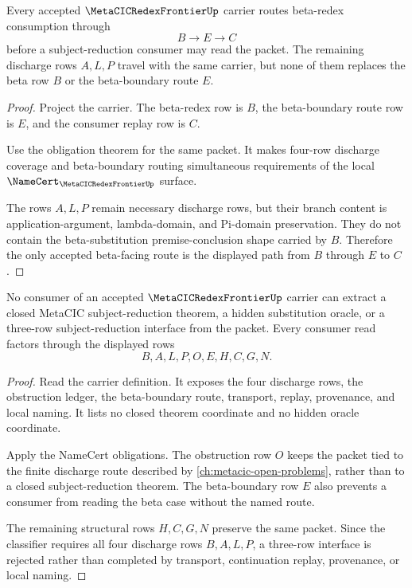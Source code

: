\begin{theorem}
\label{thm:metacic-redex-frontier-beta-boundary}
Every accepted $\MetaCICRedexFrontierUp$ carrier routes beta-redex consumption
through
$$
B \to E \to C
$$
before a subject-reduction consumer may read the packet. The remaining
discharge rows $A,L,P$ travel with the same carrier, but none of them replaces
the beta row $B$ or the beta-boundary route $E$.
\end{theorem}
\begin{proof}
Project the carrier. The beta-redex row is $B$, the beta-boundary route row is
$E$, and the consumer replay row is $C$.

Use the obligation theorem for the same packet. It makes four-row discharge
coverage and beta-boundary routing simultaneous requirements of the local
$\NameCert_{\MetaCICRedexFrontierUp}$ surface.

The rows $A,L,P$ remain necessary discharge rows, but their branch content is
application-argument, lambda-domain, and Pi-domain preservation. They do not
contain the beta-substitution premise-conclusion shape carried by $B$.
Therefore the only accepted beta-facing route is the displayed path from $B$
through $E$ to $C$.
\end{proof}

\begin{theorem}
\label{thm:metacic-redex-frontier-nonescape}
No consumer of an accepted $\MetaCICRedexFrontierUp$ carrier can extract a
closed MetaCIC subject-reduction theorem, a hidden substitution oracle, or a
three-row subject-reduction interface from the packet. Every consumer read
factors through the displayed rows
$$
B,A,L,P,O,E,H,C,G,N.
$$
\end{theorem}
\begin{proof}
Read the carrier definition. It exposes the four discharge rows, the
obstruction ledger, the beta-boundary route, transport, replay, provenance, and
local naming. It lists no closed theorem coordinate and no hidden oracle
coordinate.

Apply the NameCert obligations. The obstruction row $O$ keeps the packet tied
to the finite discharge route described by
\autoref{ch:metacic-open-problems}, rather than to a closed
subject-reduction theorem. The beta-boundary row $E$ also prevents a consumer
from reading the beta case without the named route.

The remaining structural rows $H,C,G,N$ preserve the same packet. Since the
classifier requires all four discharge rows $B,A,L,P$, a three-row interface
is rejected rather than completed by transport, continuation replay,
provenance, or local naming.
\end{proof}

